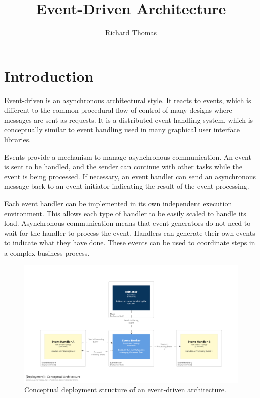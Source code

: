 \title{Event-Driven Architecture}
\author{Richard Thomas}
\date{}

\maketitle

\section{Introduction}\label{sec:intro}

Event-driven is an asynchronous architectural style.
It reacts to events, which is different to the common procedural flow of control of many designs where messages are sent as requests.
It is a distributed event handling system, which is conceptually similar to event handling used in many graphical user interface libraries.

Events provide a mechanism to manage asynchronous communication.
An event is sent to be handled, and the sender can continue with other tasks while the event is being processed.
If necessary, an event handler can send an asynchronous message back to an event initiator indicating the result of the event processing.

Each event handler can be implemented in its own independent execution environment.
This allows each type of handler to be easily scaled to handle its load.
Asynchronous communication means that event generators do not need to wait for the handler to process the event.
Handlers can generate their own events to indicate what they have done.
These events can be used to coordinate steps in a complex business process.

\begin{figure}[h!]
    \begin{adjustwidth}{-10mm}{-10mm}
        \centering
        \includegraphics[trim=195 195 195 195,clip,width=0.95\paperwidth]{diagrams/conceptual-architecture.png}
    \end{adjustwidth}
    \caption{Conceptual deployment structure of an event-driven architecture.}
    \label{fig:conceptual-architecture}
\end{figure}

